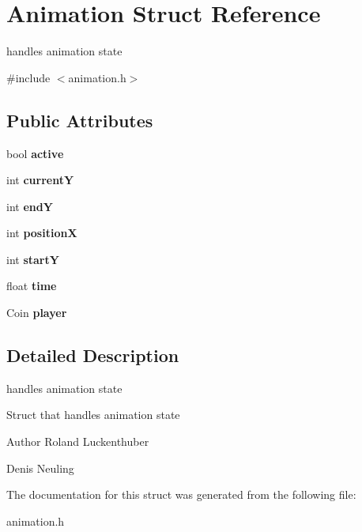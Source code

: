 \hypertarget{structAnimation}{\section{\-Animation \-Struct \-Reference}
\label{structAnimation}
}


handles animation state  




{\ttfamily \#include $<$animation.\-h$>$}

\subsection*{\-Public \-Attributes}
\begin{DoxyCompactItemize}
\item 
\hypertarget{structAnimation_ab7b2041b8fe676c3980eb27feb3c24d7}{bool {\bfseries active}}\label{structAnimation_ab7b2041b8fe676c3980eb27feb3c24d7}

\item 
\hypertarget{structAnimation_a0e5e8258f63ad3af3889c05dadbd50dd}{int {\bfseries current\-Y}}\label{structAnimation_a0e5e8258f63ad3af3889c05dadbd50dd}

\item 
\hypertarget{structAnimation_a270b071f76360d3a3d354fdc82034273}{int {\bfseries end\-Y}}\label{structAnimation_a270b071f76360d3a3d354fdc82034273}

\item 
\hypertarget{structAnimation_a4a79cc62a84e6f59fe7a9671c45e9afa}{int {\bfseries position\-X}}\label{structAnimation_a4a79cc62a84e6f59fe7a9671c45e9afa}

\item 
\hypertarget{structAnimation_ab9869e44134973b0d48506e8948cce40}{int {\bfseries start\-Y}}\label{structAnimation_ab9869e44134973b0d48506e8948cce40}

\item 
\hypertarget{structAnimation_ad8d4d4bba5b9accfba17cc9ecf5f3b50}{float {\bfseries time}}\label{structAnimation_ad8d4d4bba5b9accfba17cc9ecf5f3b50}

\item 
\hypertarget{structAnimation_a4d5850dde030ebc98d8f7a4427390ee4}{\-Coin {\bfseries player}}\label{structAnimation_a4d5850dde030ebc98d8f7a4427390ee4}

\end{DoxyCompactItemize}


\subsection{\-Detailed \-Description}
handles animation state 

\-Struct that handles animation state

\begin{DoxyAuthor}{\-Author}
\-Roland \-Luckenthuber 

\-Denis \-Neuling 
\end{DoxyAuthor}


\-The documentation for this struct was generated from the following file\-:\begin{DoxyCompactItemize}
\item 
animation.\-h\end{DoxyCompactItemize}
